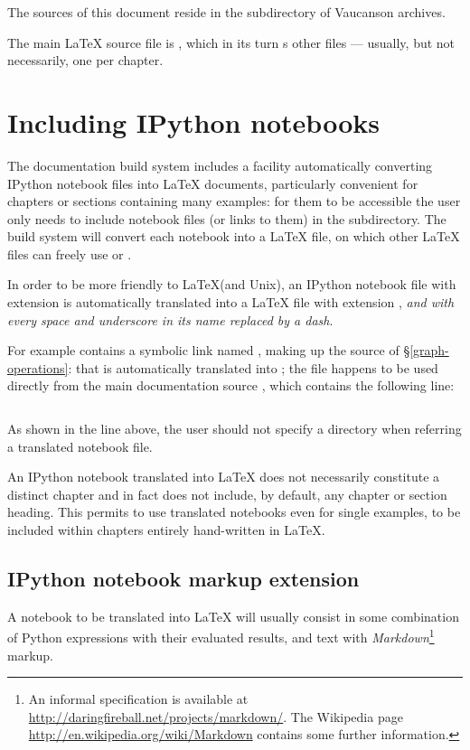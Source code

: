 The sources of this document reside in the 
subdirectory of Vaucanson archives.

\index{\LaTeX{}}
The main \LaTeX{} source file is
, which in its turn
\verb!!s other files --- usually, but not necessarily, one per
chapter.

\section{Including IPython notebooks}
The documentation build system includes a facility automatically converting
IPython notebook files into \LaTeX{} documents, particularly convenient for
chapters or sections containing many examples: for them to be accessible the
user only needs to include notebook files (or links to them) in the
 subdirectory.  The build system will
convert each notebook into a \LaTeX{} file, on which other \LaTeX{} files can
freely use \verb!! or \verb!!.

In order to be more friendly to \LaTeX (and Unix), an IPython notebook
file with extension  is automatically translated into a
\LaTeX{} file with extension , \textit{and with every space
  and underscore in its name replaced by a dash}.

For example  contains a symbolic
link named , making up the source of
§\ref{graph-operations}: that is automatically translated into
; the file happens to be used directly from
the main documentation source , which
contains the following line:
\begin{verbatim}

\end{verbatim}
As shown in the line above, the user should not specify a directory
when referring a translated notebook file.

 An IPython notebook translated into \LaTeX{} does not
necessarily constitute a distinct chapter and in fact does not include, by
default, any chapter or section heading.  This permits to use translated
notebooks even for single examples, to be included within chapters entirely
hand-written in \LaTeX{}.

\subsection{IPython notebook markup extension}
A notebook to be translated into \LaTeX{} will usually consist in some
combination of Python expressions with their evaluated results, and
text with \textit{Markdown}\footnote{An informal specification is
  available at \url{http://daringfireball.net/projects/markdown/}.
  The Wikipedia page \url{http://en.wikipedia.org/wiki/Markdown}
  contains some further information.}
markup.

